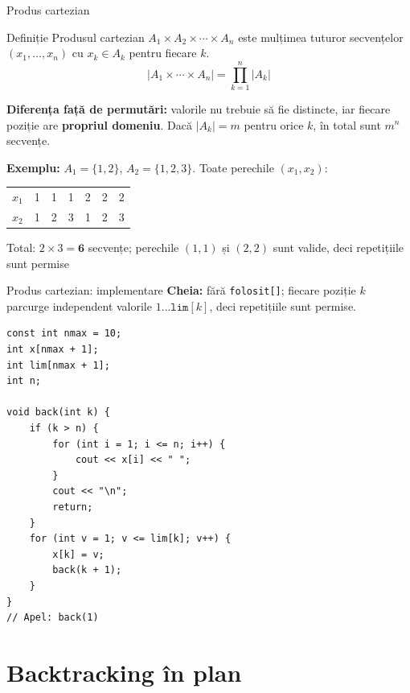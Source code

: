 \documentclass[8pt,mathserif]{beamer}
\begin{document}
\begin{frame}{Produs cartezian}
  \begin{block}{Definiție}
    Produsul cartezian $A_1 \times A_2 \times \cdots \times A_n$ este mulțimea tuturor secvențelor $(x_1, \ldots, x_n)$ cu $x_k \in A_k$ pentru fiecare $k$.
    \[ |A_1 \times \cdots \times A_n| = \prod_{k=1}^{n} |A_k| \]
  \end{block}
  \textbf{Diferența față de permutări:} valorile nu trebuie să fie distincte, iar fiecare poziție are \textbf{propriul domeniu}. Dacă $|A_k| = m$ pentru orice $k$, în total sunt $m^n$ secvențe.
  \smallskip

  \textbf{Exemplu:} $A_1 = \{1,2\}$, $A_2 = \{1,2,3\}$. Toate perechile $(x_1, x_2)$:
  \smallskip

  \centering
  \begin{tabular}{@{}ccccccc@{}}
    \toprule
    $x_1$ & 1 & 1 & 1 & 2 & 2 & 2 \\
    $x_2$ & 1 & 2 & 3 & 1 & 2 & 3 \\
    \bottomrule
  \end{tabular}

  \smallskip
  \raggedright Total: $2 \times 3 = \mathbf{6}$ secvențe; perechile $(1,1)$ și $(2,2)$ sunt valide, deci repetițiile sunt permise
\end{frame}

\begin{frame}[fragile]{Produs cartezian: implementare}
  \textbf{Cheia:} fără \texttt{folosit[]}; fiecare poziție $k$ parcurge independent valorile $1 \ldots \texttt{lim}[k]$, deci repetițiile sunt permise.
  \begin{lstlisting}
const int nmax = 10;
int x[nmax + 1];
int lim[nmax + 1];
int n;

void back(int k) {
    if (k > n) {
        for (int i = 1; i <= n; i++) {
            cout << x[i] << " ";
        }
        cout << "\n";
        return;
    }
    for (int v = 1; v <= lim[k]; v++) {
        x[k] = v;
        back(k + 1);
    }
}
// Apel: back(1)
  \end{lstlisting}
\end{frame}

\section{Backtracking în plan}
\end{document}

